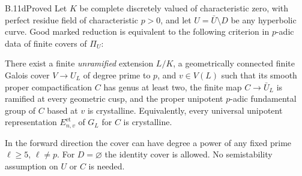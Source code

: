 \begin{claim}{B.11d}{Proved}
Let $K$ be complete discretely valued of characteristic zero, with perfect
residue field of characteristic $p>0$, and let $U=\bar U\setminus D$ be
any hyperbolic curve. Good marked reduction is equivalent to the following
criterion in $p$-adic data of finite covers of $\Pi_U$:

There exist a finite \emph{unramified} extension $L/K$, a geometrically
connected finite Galois cover $V\to U_L$ of degree prime to $p$, and
$v\in V(L)$ such that its smooth proper compactification $C$ has genus
at least two, the finite map $C\to\bar U_L$ is ramified at every
geometric cusp, and the proper unipotent $p$-adic fundamental group of
$C$ based at $v$ is crystalline. Equivalently, every universal unipotent
representation $E^{\mathrm{et}}_{n,v}$ of $G_L$ for $C$ is crystalline.

In the forward direction the cover can have degree a power of any fixed
prime $\ell\ge5$, $\ell\ne p$. For $D=\varnothing$ the identity cover
is allowed. No semistability assumption on $U$ or $C$ is needed.
\end{claim}
